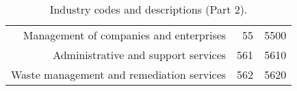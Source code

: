 \begin{table}[H]
\begin{center}
\begin{tabular}{rrr}
Management of companies and enterprises                              & 55          & 5500      \\%
Administrative and support services                                  & 561         & 5610      \\%
Waste management and remediation services                            & 562         & 5620      \\%
\hline\hline
\end{tabular}
\end{center}
\caption{\label{tab:industries_2}Industry codes and descriptions (Part 2).}
\end{table}


